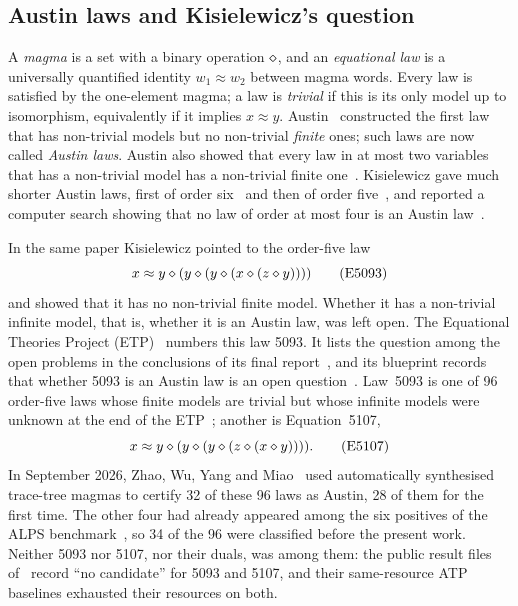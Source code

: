 \subsection{Austin laws and Kisielewicz's question}
A \emph{magma} is a set with a binary operation $\mathbin{\diamond}$, and an \emph{equational
law} is a universally quantified identity $w_1\approx w_2$ between magma words.
Every law is satisfied by the one-element magma; a law is \emph{trivial} if this
is its only model up to isomorphism, equivalently if it implies $x\approx y$.
Austin~\cite{Austin1965} constructed the first law that has non-trivial models
but no non-trivial \emph{finite} ones; such laws are now called \emph{Austin
laws}. Austin also showed that every law in at most two variables that has a
non-trivial model has a non-trivial finite one~\cite{Austin1966}. Kisielewicz gave much shorter Austin
laws, first of order six~\cite{Kisielewicz1990} and then of order
five~\cite{Kisielewicz1997}, and reported a computer search showing that no law
of order at most four is an Austin law~\cite{Kisielewicz1997}.

In the same paper Kisielewicz pointed to the order-five law
\begin{equation}\label{eq:5093}
  x \approx y \mathbin{\diamond} (y \mathbin{\diamond} (y \mathbin{\diamond} (x \mathbin{\diamond} (z \mathbin{\diamond} y)))) \tag{E5093}
\end{equation}
and showed that it has no non-trivial finite model. Whether it has a
non-trivial infinite model, that is, whether it is an Austin law, was left open.
The Equational Theories Project (ETP)~\cite{ETP2025,ETPblueprint} numbers this
law 5093. It lists the question among the open problems in the conclusions of
its final report~\cite{ETP2025}, and its blueprint records that whether 5093 is
an Austin law is an open question~\cite{ETPblueprint}. Law~5093 is one of 96
order-five laws whose finite models are trivial but whose infinite models were
unknown at the end of the ETP~\cite[chapter ``Order 5 Austin
laws'']{ETPblueprint}; another is Equation~5107,
\begin{equation}\label{eq:5107}
  x \approx y \mathbin{\diamond} (y \mathbin{\diamond} (y \mathbin{\diamond} (z \mathbin{\diamond} (x \mathbin{\diamond} y)))). \tag{E5107}
\end{equation}
In September 2026, Zhao, Wu, Yang and Miao~\cite{ZWYM2026} used automatically
synthesised trace-tree magmas to certify 32 of these 96 laws as Austin, 28 of
them for the first time. The other four had already appeared among the six
positives of the ALPS benchmark~\cite{ALPS2026}, so 34 of the 96 were
classified before the present work. Neither 5093 nor 5107, nor their duals,
was among them: the public result files of~\cite{ZWYM2026} record ``no
candidate'' for 5093 and 5107, and their same-resource ATP baselines exhausted
their resources on both.

